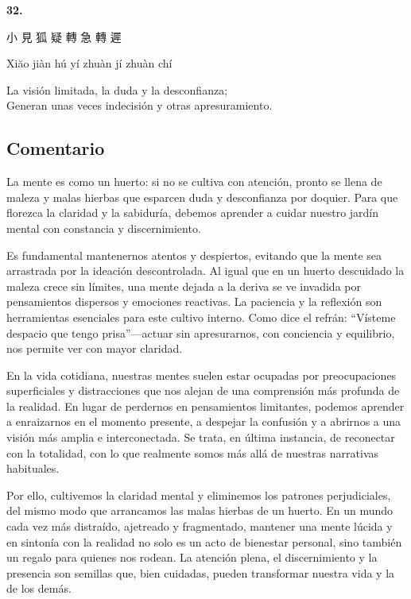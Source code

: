 \documentclass[
  a5paperpaper,
]{article}
\begin{document}
\hfill\break

\hypertarget{02}{}
\begin{verseblock}

\newpage

\begin{center}\textbf{32.}\end{center}

小 見 狐 疑 轉 急 轉 遲

Xiăo jiàn hú yí zhuàn jí zhuàn chí

La visión limitada, la duda y la desconfianza;\\
Generan unas veces indecisión y otras apresuramiento.

\end{verseblock}

\hfill\break

\hypertarget{comentario-31}{%
\subsection{Comentario}\label{comentario-31}}

La mente es como un huerto: si no se cultiva con atención, pronto se
llena de maleza y malas hierbas que esparcen duda y desconfianza por
doquier. Para que florezca la claridad y la sabiduría, debemos aprender
a cuidar nuestro jardín mental con constancia y discernimiento.

Es fundamental mantenernos atentos y despiertos, evitando que la mente
sea arrastrada por la ideación descontrolada. Al igual que en un huerto
descuidado la maleza crece sin límites, una mente dejada a la deriva se
ve invadida por pensamientos dispersos y emociones reactivas. La
paciencia y la reflexión son herramientas esenciales para este cultivo
interno. Como dice el refrán: ``Vísteme despacio que tengo
prisa''---actuar sin apresurarnos, con conciencia y equilibrio, nos
permite ver con mayor claridad.

En la vida cotidiana, nuestras mentes suelen estar ocupadas por
preocupaciones superficiales y distracciones que nos alejan de una
comprensión más profunda de la realidad. En lugar de perdernos en
pensamientos limitantes, podemos aprender a enraizarnos en el momento
presente, a despejar la confusión y a abrirnos a una visión más amplia e
interconectada. Se trata, en última instancia, de reconectar con la
totalidad, con lo que realmente somos más allá de nuestras narrativas
habituales.

Por ello, cultivemos la claridad mental y eliminemos los patrones
perjudiciales, del mismo modo que arrancamos las malas hierbas de un
huerto. En un mundo cada vez más distraído, ajetreado y fragmentado,
mantener una mente lúcida y en sintonía con la realidad no solo es un
acto de bienestar personal, sino también un regalo para quienes nos
rodean. La atención plena, el discernimiento y la presencia son semillas
que, bien cuidadas, pueden transformar nuestra vida y la de los demás.
\end{document}
